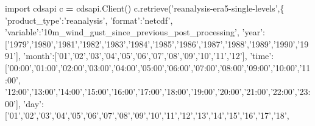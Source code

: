 \documentclass[12pt,twoside]{reedthesis}
\newenvironment{Shaded}{\begin{snugshade}}{\end{snugshade}}
\newcommand{\ImportTok}[1]{#1}
\newcommand{\NormalTok}[1]{#1}
\newcommand{\OperatorTok}[1]{\textcolor[rgb]{0.81,0.36,0.00}{\textbf{#1}}}
\newcommand{\StringTok}[1]{\textcolor[rgb]{0.31,0.60,0.02}{#1}}
\begin{document}
\scriptsize

\vspace{0.4cm}
\begin{Shaded}
\begin{Highlighting}[]
      \ImportTok{import}\NormalTok{ cdsapi}
\NormalTok{      c }\OperatorTok{=}\NormalTok{ cdsapi.Client()}
\NormalTok{      c.retrieve(}\StringTok{'reanalysis-era5-single-levels'}\NormalTok{,\{}
       \StringTok{'product_type'}\NormalTok{:}\StringTok{'reanalysis'}\NormalTok{,}
       \StringTok{'format'}\NormalTok{:}\StringTok{'netcdf'}\NormalTok{,}
       \StringTok{'variable'}\NormalTok{:}\StringTok{'10m_wind_gust_since_previous_post_processing'}\NormalTok{,}
       \StringTok{'year'}\NormalTok{:[}\StringTok{'1979'}\NormalTok{,}\StringTok{'1980'}\NormalTok{,}\StringTok{'1981'}\NormalTok{,}\StringTok{'1982'}\NormalTok{,}\StringTok{'1983'}\NormalTok{,}\StringTok{'1984'}\NormalTok{,}\StringTok{'1985'}\NormalTok{,}\StringTok{'1986'}\NormalTok{,}\StringTok{'1987'}\NormalTok{,}\StringTok{'1988'}\NormalTok{,}\StringTok{'1989'}\NormalTok{,}\StringTok{'1990'}\NormalTok{,}\StringTok{'1991'}\NormalTok{],}
       \StringTok{'month'}\NormalTok{:[}\StringTok{'01'}\NormalTok{,}\StringTok{'02'}\NormalTok{,}\StringTok{'03'}\NormalTok{,}\StringTok{'04'}\NormalTok{,}\StringTok{'05'}\NormalTok{,}\StringTok{'06'}\NormalTok{,}\StringTok{'07'}\NormalTok{,}\StringTok{'08'}\NormalTok{,}\StringTok{'09'}\NormalTok{,}\StringTok{'10'}\NormalTok{,}\StringTok{'11'}\NormalTok{,}\StringTok{'12'}\NormalTok{],}
       \StringTok{'time'}\NormalTok{:[}\StringTok{'00:00'}\NormalTok{,}\StringTok{'01:00'}\NormalTok{,}\StringTok{'02:00'}\NormalTok{,}\StringTok{'03:00'}\NormalTok{,}\StringTok{'04:00'}\NormalTok{,}\StringTok{'05:00'}\NormalTok{,}\StringTok{'06:00'}\NormalTok{,}\StringTok{'07:00'}\NormalTok{,}\StringTok{'08:00'}\NormalTok{,}\StringTok{'09:00'}\NormalTok{,}\StringTok{'10:00'}\NormalTok{,}\StringTok{'11:00'}\NormalTok{,}
              \StringTok{'12:00'}\NormalTok{,}\StringTok{'13:00'}\NormalTok{,}\StringTok{'14:00'}\NormalTok{,}\StringTok{'15:00'}\NormalTok{,}\StringTok{'16:00'}\NormalTok{,}\StringTok{'17:00'}\NormalTok{,}\StringTok{'18:00'}\NormalTok{,}\StringTok{'19:00'}\NormalTok{,}\StringTok{'20:00'}\NormalTok{,}\StringTok{'21:00'}\NormalTok{,}\StringTok{'22:00'}\NormalTok{,}\StringTok{'23:00'}\NormalTok{],}
       \StringTok{'day'}\NormalTok{:[}\StringTok{'01'}\NormalTok{,}\StringTok{'02'}\NormalTok{,}\StringTok{'03'}\NormalTok{,}\StringTok{'04'}\NormalTok{,}\StringTok{'05'}\NormalTok{,}\StringTok{'06'}\NormalTok{,}\StringTok{'07'}\NormalTok{,}\StringTok{'08'}\NormalTok{,}\StringTok{'09'}\NormalTok{,}\StringTok{'10'}\NormalTok{,}\StringTok{'11'}\NormalTok{,}\StringTok{'12'}\NormalTok{,}\StringTok{'13'}\NormalTok{,}\StringTok{'14'}\NormalTok{,}\StringTok{'15'}\NormalTok{,}\StringTok{'16'}\NormalTok{,}\StringTok{'17'}\NormalTok{,}\StringTok{'18'}\NormalTok{,}

\end{Highlighting}
\end{Shaded}
\end{document}
